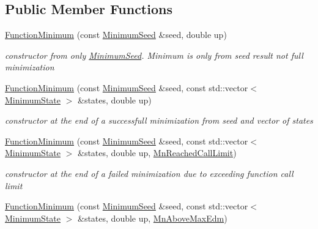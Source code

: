 \subsection*{Public Member Functions}
\begin{DoxyCompactItemize}
\item 
\mbox{\hyperlink{classROOT_1_1Minuit2_1_1FunctionMinimum_a907871106f0be755404d80f32fbe2041}{Function\+Minimum}} (const \mbox{\hyperlink{classROOT_1_1Minuit2_1_1MinimumSeed}{Minimum\+Seed}} \&seed, double up)
\begin{DoxyCompactList}\small\item\em constructor from only \mbox{\hyperlink{classROOT_1_1Minuit2_1_1MinimumSeed}{Minimum\+Seed}}. Minimum is only from seed result not full minimization \end{DoxyCompactList}\item 
\mbox{\hyperlink{classROOT_1_1Minuit2_1_1FunctionMinimum_a0d5de11a4f528f8c0a0d061dbcf3e91e}{Function\+Minimum}} (const \mbox{\hyperlink{classROOT_1_1Minuit2_1_1MinimumSeed}{Minimum\+Seed}} \&seed, const std\+::vector$<$ \mbox{\hyperlink{classROOT_1_1Minuit2_1_1MinimumState}{Minimum\+State}} $>$ \&states, double up)
\begin{DoxyCompactList}\small\item\em constructor at the end of a successfull minimization from seed and vector of states \end{DoxyCompactList}\item 
\mbox{\hyperlink{classROOT_1_1Minuit2_1_1FunctionMinimum_aa68c6d1a70d47537fef4990cd797ebc0}{Function\+Minimum}} (const \mbox{\hyperlink{classROOT_1_1Minuit2_1_1MinimumSeed}{Minimum\+Seed}} \&seed, const std\+::vector$<$ \mbox{\hyperlink{classROOT_1_1Minuit2_1_1MinimumState}{Minimum\+State}} $>$ \&states, double up, \mbox{\hyperlink{classROOT_1_1Minuit2_1_1FunctionMinimum_1_1MnReachedCallLimit}{Mn\+Reached\+Call\+Limit}})
\begin{DoxyCompactList}\small\item\em constructor at the end of a failed minimization due to exceeding function call limit \end{DoxyCompactList}\item 
\mbox{\hyperlink{classROOT_1_1Minuit2_1_1FunctionMinimum_a70961c8a405bd4298247c9b353804154}{Function\+Minimum}} (const \mbox{\hyperlink{classROOT_1_1Minuit2_1_1MinimumSeed}{Minimum\+Seed}} \&seed, const std\+::vector$<$ \mbox{\hyperlink{classROOT_1_1Minuit2_1_1MinimumState}{Minimum\+State}} $>$ \&states, double up, \mbox{\hyperlink{classROOT_1_1Minuit2_1_1FunctionMinimum_1_1MnAboveMaxEdm}{Mn\+Above\+Max\+Edm}})

\end{DoxyCompactItemize}
